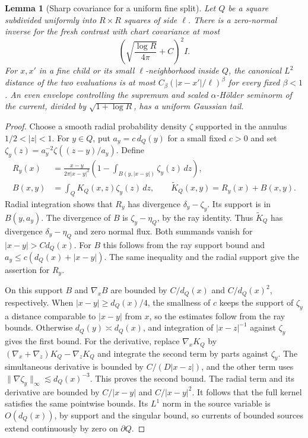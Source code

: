 \documentclass[11pt]{article}
\newtheorem{lemma}{Lemma}
\newcommand{\1}{\mathbf{1}}
\numberwithin{equation}{section}
\begin{document}
\begin{lemma}[Sharp covariance for a uniform fine split]
\label{lem:sharp-fine-kernel}
Let \(Q\) be a square subdivided uniformly into \(R\times R\)
squares of side \(\ell\). There is a zero-normal inverse
for the fresh contrast with chart covariance at most
\[
 \left(\sqrt{\frac{\log R}{4\pi}}+C\right)^2 I .
\]
For \(x,x'\) in a fine child or its small \(\ell\)-neighborhood
inside \(Q\), the canonical \(L^2\) distance of the two
evaluations is at most \(C_\beta(|x-x'|/\ell)^\beta\) for
every fixed \(\beta<1\). An even envelope controlling the
supremum and scaled \(\alpha\)-H\"older seminorm of the current,
divided by \(\sqrt{1+\log R}\), has a uniform Gaussian tail.
\end{lemma}

\begin{proof}
Choose a smooth radial probability density \(\zeta\) supported
in the annulus \(1/2<|z|<1\). For \(y\in Q\), put
\(a_y=c\,d_Q(y)\) for a small fixed \(c>0\) and set
\(\zeta_y(z)=a_y^{-2}\zeta((z-y)/a_y)\). Define
\[
\begin{aligned}
 R_y(x)&=\frac{x-y}{2\pi |x-y|^2}
       \left(1-\int_{B(y,|x-y|)}\zeta_y(z)\,dz\right),\\
 B(x,y)&=\int_Q K_Q(x,z)\zeta_y(z)\,dz,\qquad
 \widetilde K_Q(x,y)=R_y(x)+B(x,y).
\end{aligned}
\]
Radial integration shows that \(R_y\) has divergence
\(\delta_y-\zeta_y\). Its support is in \(B(y,a_y)\).
The divergence of \(B\) is \(\zeta_y-\eta_Q\), by the ray
identity. Thus \(\widetilde K_Q\) has divergence
\(\delta_y-\eta_Q\) and zero normal flux. Both summands vanish
for \(|x-y|>C d_Q(x)\). For \(B\) this follows from the ray
support bound and \(a_y\le c(d_Q(x)+|x-y|)\). The same
inequality and the radial support give the assertion for \(R_y\).

On this support \(B\) and \(\nabla_x B\) are bounded by
\(C/d_Q(x)\) and \(C/d_Q(x)^2\), respectively. When
\(|x-y|\ge d_Q(x)/4\), the smallness of \(c\) keeps the
support of \(\zeta_y\) a distance comparable to \(|x-y|\)
from \(x\), so the estimates follow from the ray bounds.
Otherwise \(d_Q(y)\asymp d_Q(x)\), and integration of
\(|x-z|^{-1}\) against \(\zeta_y\) gives the first bound.
For the derivative, replace \(\nabla_x K_Q\) by
\((\nabla_x+\nabla_z)K_Q-\nabla_z K_Q\) and integrate the
second term by parts against \(\zeta_y\). The simultaneous
derivative is bounded by \(C/(D|x-z|)\), and the other term
uses \(\|\nabla\zeta_y\|_\infty\lesssim d_Q(x)^{-3}\).
This proves the second bound. The radial term and its
derivative are bounded by \(C/|x-y|\) and \(C/|x-y|^2\).
It follows that the full kernel satisfies the same pointwise
bounds. Its \(L^1\) norm in the source variable is
\(O(d_Q(x))\), by support and the singular bound, so currents
of bounded sources extend continuously by zero on \(\partial Q\).


\end{proof}
\end{document}
